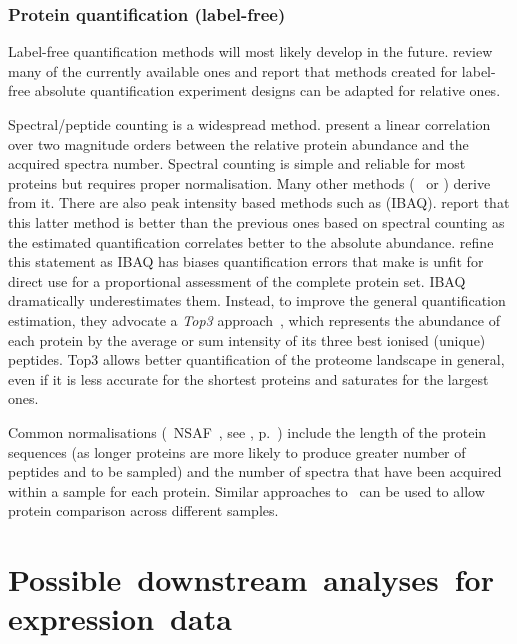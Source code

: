 \subsubsection{Protein quantification (label-free)}\label{subsubsec:protQuantLB}

Label-free quantification methods will most likely develop in the future.
\citet{Nikolov2012-hq} review many of the currently available ones and report that
methods created for label-free absolute quantification experiment designs
can be adapted for relative ones.

Spectral/peptide counting is a widespread method.
\citet{Liu2004-cj} present a linear correlation over two magnitude orders
between the relative protein abundance and the acquired spectra number.
Spectral counting is simple and reliable for most proteins
but requires proper normalisation.
Many other methods (\eg\  or )
derive from it.
There are also peak intensity based methods such as  (\gls{IBAQ}).
\citet{Arike2012} report that this latter method is better than the previous ones
based on spectral counting as the estimated quantification correlates better to
the absolute abundance.
\citet{TOP3isbetter} refine this statement
as \gls{IBAQ} has biases quantification errors
that make is unfit for direct
use for a proportional assessment of the complete protein set.
\gls{IBAQ} dramatically underestimates them.
Instead, to improve the general quantification estimation,
they advocate a \emph{Top3} approach~,
which represents the abundance of each protein by the average or sum intensity of
its three best ionised (unique) peptides.
Top3 allows better quantification of the proteome landscape in general,
even if it is less accurate for the shortest proteins and
saturates for the largest ones.

Common normalisations
(\eg\ \gls{NSAF}~, see , p.~\pageref{eq:NSAF})
include the length of the protein sequences
(as longer proteins are more likely to produce greater number of peptides and
to be sampled) and the number of spectra that have been acquired within a sample
for each protein.
Similar approaches to \Rnaseq\ can be used to allow protein comparison
across different samples.


\section{Possible~downstream~analyses~for~expression~data}\label{sec:enrichmentAnalysis}

